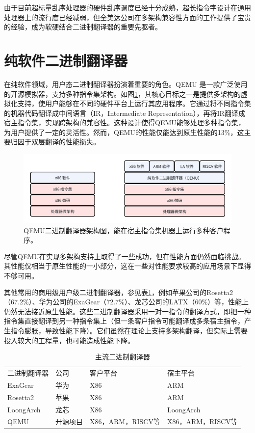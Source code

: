 由于目前超标量乱序处理器的硬件乱序调度已经十分成熟，超长指令字设计在通用处理器上的流行度已经减弱，但全美达公司在多架构兼容性方面的工作提供了宝贵的经验，成为软硬结合二进制翻译器的重要先驱者。

\section{纯软件二进制翻译器}

在纯软件领域，用户态二进制翻译器扮演着重要的角色。QEMU 是一款广泛使用的开源模拟器，支持多种指令集架构。如图\ref{img:qemu_arch}，其核心目标之一是提供多架构的虚拟化支持，使用户能够在不同的硬件平台上运行其应用程序。它通过将不同指令集的机器代码翻译成中间语言（IR，Intermediate Representation），再将IR翻译成宿主指令集，实现跨架构的兼容性。这种设计使得QEMU能够处理多种指令集，为用户提供了一定的灵活性。然而，QEMU的性能仅能达到原生性能的13\%，这主要归因于双层翻译的性能损失。

\begin{figure}[h]
  \centering
  \includegraphics[width=0.8\linewidth]{./feishuImage/qemu_arch.png}
  \caption{QEMU二进制翻译器架构图，能在宿主指令集机器上运行多种客户程序。}
  \label{img:qemu_arch}
\end{figure}

尽管QEMU在实现多架构支持上取得了一些成功，但在性能方面仍然面临挑战。其性能仅相当于原生性能的一小部分，这在一些对性能要求较高的应用场景下显得不够可用。

其他常用的商用级用户级二进制翻译器，参见表\ref{tab:BTs}，例如苹果公司的Rosetta2（67.2\%）、华为公司的ExaGear（72.7\%）、龙芯公司的LATX（60\%）等，性能上仍然无法接近原生性能。这些二进制翻译器采用一对一指令的翻译方式，即把一种指令集直接翻译到另一种指令集上（但一条客户指令可能翻译成多条宿主指令，产生指令膨胀，导致性能下降）。它们虽然在理论上支持多架构翻译，但实际上需要投入较大的工程量，也可能造成性能下降。

\begin{table}[]
\centering
\caption{主流二进制翻译器}
\label{tab:BTs}
  \begin{tabular}{llll}
  \rowcolor[HTML]{FBE5D6} 
  二进制翻译器    & 公司   & 客户平台           & 宿主平台           \\
  ExaGear   & 华为   & X86            & ARM            \\
  Rosetta2  & 苹果   & X86            & ARM            \\
  LoongArch & 龙芯   & X86            & LoongArch      \\
  QEMU      & 开源项目 & X86，ARM，RISCV等 & X86，ARM，RISCV等
  \end{tabular}
  \end{table}

